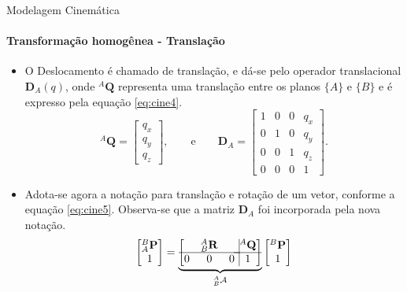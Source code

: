 \documentclass{beamer}
\begin{document}
\begin{frame}{Modelagem Cinemática}
    \framesubtitle{Transformação homogênea - Translação}
    \begin{itemize}
        \item O Deslocamento é chamado de translação, e dá-se pelo operador translacional $\mathbf{D}_A(q)$, onde ${}^A\mathbf{Q}$ representa uma translação entre os planos $\{A\}$ e $\{B\}$ e é expresso pela equação \eqref{eq:cine4}.
              \begin{equation}\label{eq:cine4}
                  {}^A\mathbf{Q} =
                  \begin{bmatrix}
                      q_x \\ q_y \\ q_z
                  \end{bmatrix}, \qquad \mathrm{e} \qquad
                  \mathbf{D}_A =
                  \begin{bmatrix}
                      1 & 0 & 0 & q_x \\
                      0 & 1 & 0 & q_y \\
                      0 & 0 & 1 & q_z \\
                      0 & 0 & 0 & 1
                  \end{bmatrix}.
              \end{equation}
        \item Adota-se agora a notação para translação e rotação de um vetor, conforme a equação \eqref{eq:cine5}. Observa-se que a matriz $\mathbf{D}_A$ foi incorporada pela nova notação.
              \begin{equation}\label{eq:cine5}
                  \begin{bmatrix}
                      {}^B_A\mathbf{P} \\ 1
                  \end{bmatrix}
                  =
                  \underbrace {
                      \left[
                          \begin{matrix}
                                & {}_B^A\mathbf{R} &   \\ \hline
                              0 & 0                & 0 \\
                          \end{matrix} \right.
                          \left.
                          \vline
                          \begin{matrix}
                              {}^A\mathbf{Q} \\ \hline
                              1
                          \end{matrix} \right]
                  }_{{}^A_B\mathcal{A}}
                  \begin{bmatrix}
                      {}^B\mathbf{P} \\
                      1
                  \end{bmatrix}
              \end{equation}
    \end{itemize}
\end{frame}
\end{document}
